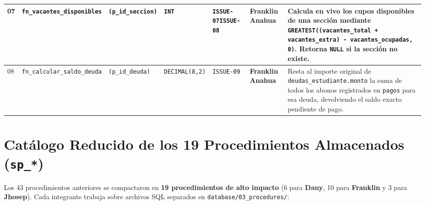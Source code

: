 \documentclass[10pt,a4paper,landscape]{article}
\newcommand{\devFranklin}{\textbf{\textcolor{teal!80!black}{Franklin Anahua}} \newline {\scriptsize(Backend / DB)}}
\begin{document}
\begin{longtable}{|p{0.5cm}|p{4.8cm}|p{4.3cm}|p{2.3cm}|p{2.2cm}|p{2.6cm}|p{8.5cm}|}
\hline
07 & \texttt{fn\_vacantes\_disponibles} & \texttt{(p\_id\_seccion)} & \texttt{INT} & \texttt{ISSUE-07}\newline \texttt{ISSUE-08} & \devFranklin & Calcula en vivo los cupos disponibles de una sección mediante \texttt{GREATEST((vacantes\_total + vacantes\_extra) - vacantes\_ocupadas, 0)}. Retorna \texttt{NULL} si la sección no existe. \\
\hline
\rowcolor{rowAlt}
08 & \texttt{fn\_calcular\_saldo\_deuda} & \texttt{(p\_id\_deuda)} & \texttt{DECIMAL(8,2)} & \texttt{ISSUE-09} & \devFranklin & Resta al importe original de \texttt{deudas\_estudiante.monto} la suma de todos los abonos registrados en \texttt{pagos} para esa deuda, devolviendo el saldo exacto pendiente de pago. \\
\hline
\end{longtable}
\normalsize

\newpage

\section{Catálogo Reducido de los 19 Procedimientos Almacenados (\texttt{sp\_*})}

Los 43 procedimientos anteriores se compactaron en \textbf{19 procedimientos de alto impacto} (6 para \textbf{Dany}, 10 para \textbf{Franklin} y 3 para \textbf{Jhosep}). Cada integrante trabaja sobre archivos SQL separados en \texttt{database/03\_procedures/}:
\end{document}
